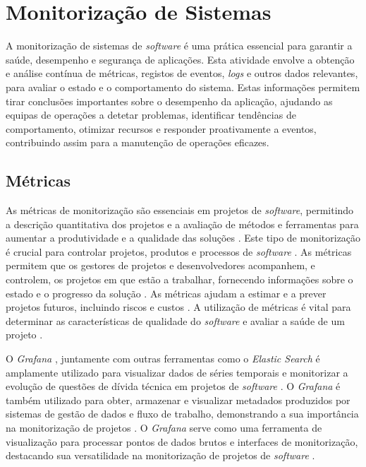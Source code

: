 \section{Monitorização de Sistemas}

A monitorização de sistemas de \textit{software} é uma prática essencial para garantir a saúde, 
desempenho e segurança de aplicações. Esta atividade envolve a obtenção e análise contínua de métricas, 
registos de eventos, \textit{logs} e outros dados relevantes, para avaliar o estado e o comportamento 
do sistema. Estas informações permitem tirar conclusões importantes sobre o desempenho da aplicação, 
ajudando as equipas de operações a detetar problemas, identificar tendências de comportamento, 
otimizar recursos e responder proativamente a eventos, contribuindo assim para a manutenção de 
operações eficazes.

\subsection{Métricas}

As métricas de monitorização são essenciais em projetos de \textit{software}, permitindo a descrição 
quantitativa dos projetos e a avaliação de métodos e ferramentas para aumentar a produtividade e a 
qualidade das soluções \cite{metrics2003}. Este tipo de monitorização é crucial para controlar 
projetos, produtos e processos de \textit{software} \cite{metrics2019}. As métricas permitem que os 
gestores de projetos e desenvolvedores acompanhem, e controlem, os projetos em que estão a trabalhar,
fornecendo informações sobre o estado e o progresso da solução \cite{metrics2016}. As 
métricas ajudam a estimar e a prever projetos futuros, incluindo riscos e custos 
\cite{metrics2016b}. A utilização de métricas é vital para determinar as características de 
qualidade do \textit{software} e avaliar a saúde de um projeto \cite{metrics2015}.

O \textit{Grafana} \cite{grafana}, juntamente com outras ferramentas como o \textit{Elastic Search}
\cite{elastic-search} é amplamente utilizado para visualizar dados de séries temporais e monitorizar
a evolução de questões de dívida técnica em projetos de \textit{software} \cite{metrics2019b}. O 
\textit{Grafana} é também utilizado para obter, armazenar e visualizar metadados produzidos por 
sistemas de gestão de dados e fluxo de trabalho, demonstrando a sua importância na monitorização 
de projetos \cite{metrics2021}. O \textit{Grafana} serve como uma ferramenta de visualização para 
processar pontos de dados brutos e interfaces de monitorização, destacando sua versatilidade na 
monitorização de projetos de \textit{software} \cite{metrics2022}.

